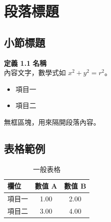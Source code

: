 \section{段落標題}
\subsection{小節標題}

\begin{narrowframed}
\textbf{定義 1.1}\textbf{ 名稱}\\
內容文字，數學式如 $x^2 + y^2 = r^2$。
\end{narrowframed}

\begin{itemize}
    \item 項目一
    \item 項目二
\end{itemize}

\begin{whitebox}
無框區塊，用來隔開段落內容。
\end{whitebox}

\subsection{表格範例}

\begin{table}[H]
    \centering
    \caption{一般表格}
    \vspace{8pt}
    \begin{tabular}{lcc}
        \toprule
        欄位 & 數值 A & 數值 B \\
        \midrule
        項目一 & 1.00 & 2.00 \\
        項目二 & 3.00 & 4.00 \\
        \bottomrule
    \end{tabular}
\end{table}

\begin{table}[H]
    \centering
    \caption{寬表格，以 resizebox 縮放至版寬}
    \vspace{8pt}
\end{table}

